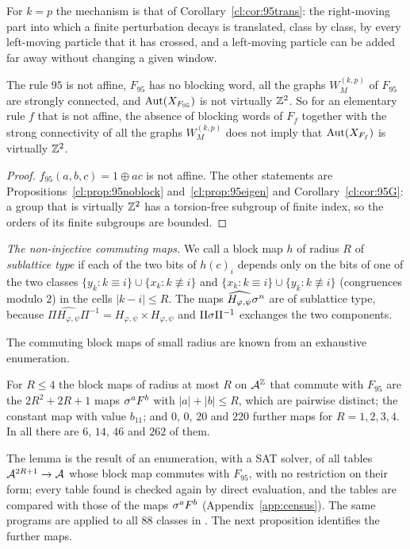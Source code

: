 For $k=p$ the mechanism is that of Corollary~\ref{cl:cor:95trans}: the right-moving part into which a finite perturbation decays is translated, class by class, by every left-moving particle that it has crossed, and a left-moving particle can be added far away without changing a given window.

\begin{corollary}\label{cl:cor:95dich}
The rule $95$ is not affine, $F_{95}$ has no blocking word, all the graphs $W^{(k,p)}_M$ of $F_{95}$ are strongly connected, and $\operatorname{Aut}(X_{F_{95}})$ is not virtually $\mathbb{Z}^2$. So for an elementary rule $f$ that is not affine, the absence of blocking words of $F_f$ together with the strong connectivity of all the graphs $W^{(k,p)}_M$ does not imply that $\operatorname{Aut}(X_{F_f})$ is virtually $\mathbb{Z}^2$.
\end{corollary}

\begin{proof}
$f_{95}(a,b,c)=1\oplus ac$ is not affine. The other statements are Propositions~\ref{cl:prop:95noblock} and~\ref{cl:prop:95eigen} and Corollary~\ref{cl:cor:95G}: a group that is virtually $\mathbb{Z}^2$ has a torsion-free subgroup of finite index, so the orders of its finite subgroups are bounded.
\end{proof}

\emph{The non-injective commuting maps.} We call a block map $h$ of radius $R$ of \emph{sublattice type} if each of the two bits of $h(c)_i$ depends only on the bits of one of the two classes $\{y_k:k\equiv i\}\cup\{x_k:k\not\equiv i\}$ and $\{x_k:k\equiv i\}\cup\{y_k:k\not\equiv i\}$ (congruences modulo $2$) in the cells $|k-i|\le R$. The maps $\widehat{H_{\varphi,\psi}}\sigma^n$ are of sublattice type, because $\Pi\widehat{H_{\varphi,\psi}}\Pi^{-1}=H_{\varphi,\psi}\times H_{\varphi,\psi}$ and $\Pi\sigma\Pi^{-1}$ exchanges the two components.

The commuting block maps of small radius are known from an exhaustive enumeration.

\begin{lemma}\label{cl:lem:95cens}
For $R\le4$ the block maps of radius at most $R$ on $\mathcal{A}^{\mathbb{Z}}$ that commute with $F_{95}$ are the $2R^2+2R+1$ maps $\sigma^aF^b$ with $|a|+|b|\le R$, which are pairwise distinct; the constant map with value $b_{11}$; and $0$, $0$, $20$ and $220$ further maps for $R=1,2,3,4$. In all there are $6$, $14$, $46$ and $262$ of them.
\end{lemma}

The lemma is the result of an enumeration, with a SAT solver, of all tables $\mathcal{A}^{2R+1}\to\mathcal{A}$ whose block map commutes with $F_{95}$, with no restriction on their form; every table found is checked again by direct evaluation, and the tables are compared with those of the maps $\sigma^aF^b$ (Appendix~\ref{app:census}). The same programs are applied to all $88$ classes in \cite{PaperD}. The next proposition identifies the further maps.

